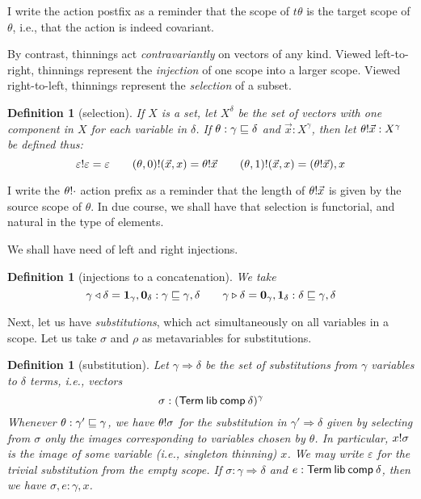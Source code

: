 \documentclass{jfp1}
\newtheorem{definition}[theorem]{Definition}
\newcommand{\emp}{\varepsilon}
\begin{document}
I write the action postfix as a reminder that the scope of $t\theta$
is the target scope of $\theta$, i.e., that the action is indeed covariant.

By contrast, thinnings act \emph{contravariantly} on vectors of any kind.
Viewed left-to-right, thinnings represent the \emph{injection} of one scope
into a larger scope. Viewed right-to-left, thinnings represent the
\emph{selection} of a subset.

\begin{definition}[selection]
  If $X$ is a set, let $X^\delta$ be the set of vectors with one
  component in $X$ for each variable in $\delta$. If
  $\theta:\gamma\sqsubseteq\delta$ and $\vec x:X^\gamma$,
  then let $\theta!\vec x : X^\gamma$ be defined thus:
  \[
    \sel\emp\emp=\emp \qquad
    \sel{(\theta,0)}{(\vec x,x)} = \sel\theta{\vec x} \qquad
    \sel{(\theta,1)}{(\vec x,x)} = (\sel\theta{\vec x}),x
  \]
\end{definition}

I write the $\theta!\cdot$ action prefix as a reminder that the
length of $\theta!\vec x$ is given by the source scope
of $\theta$. In due course, we shall have that selection is
functorial, and natural in the type of elements.

We shall have need of left and right injections.
\newcommand{\thinl}[2]{#1 \triangleleft #2}
\newcommand{\thinr}[2]{#1 \triangleright #2}
\begin{definition}[injections to a concatenation]
  We take
  \[
    \thinl\gamma\delta = \ith_\gamma,\eth_\delta :
    \gamma\thin\gamma,\delta \qquad
    \thinr\gamma\delta = \eth_\gamma,\ith_\delta :
    \delta\thin\gamma,\delta
    \]
\end{definition}

Next, let us have \emph{substitutions}, which act simultaneously on all variables
in a scope. Let us take $\sigma$ and $\rho$ as metavariables for substitutions.

\newcommand{\su}{\Rightarrow}
\begin{definition}[substitution]
  Let $\gamma\su\delta$ be the set of substitutions from $\gamma$ variables to $\delta$ terms,
  i.e., vectors \[\sigma : (\mathsf{Term}\:\mathsf{lib}\:\mathsf{comp}\:\delta)^\gamma\]
  Whenever $\theta : \gamma'\sqsubseteq\gamma$, we have $\theta!\sigma$
  for the substitution in $\gamma'\su\delta$ given by selecting from
  $\sigma$ only the images corresponding to variables chosen by
  $\theta$. In particular, $x!\sigma$ is the image of some variable
  (i.e., singleton thinning)
  $x$. 
  We may write $\emp$ for the trivial
  substitution from the empty scope. If $\sigma : \gamma \su \delta$
  and $e : \mathsf{Term}\:\mathsf{lib}\:\mathsf{comp}\:\delta$, then we have $\sigma,e : \gamma,x$.
\end{definition}
\end{document}
